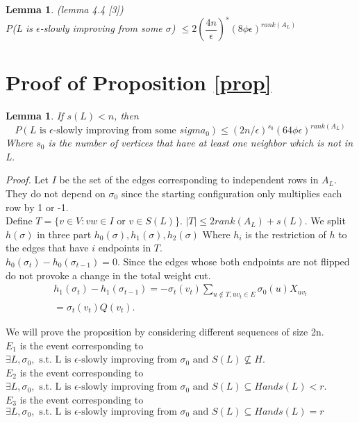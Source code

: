 \documentclass[12pt]{article}
\newtheorem{lemma}[theorem]{Lemma}
\begin{document}
\begin{lemma}(lemma 4.4 [3])\\
\label{bound}
P(L is $\epsilon$-slowly improving from some $\sigma$) $\leq 2 (\dfrac{4n}{\epsilon})^s (8\phi \epsilon)^{rank(A_L)}$

\end{lemma}


\section{Proof of Proposition \ref{prop}}

\begin{lemma}
If $s(L) < n$, then \\
\begin{equation*}
P(L \text{ is }\epsilon\text{-slowly improving from some }sigma_0)  \leq (2n/\epsilon)^{s_0}(64\phi\epsilon)^{rank(A_L)}
\end{equation*}
Where $s_0$ is the number of vertices that have at least one neighbor which is not in L. 
\end{lemma}

\textit{Proof.} Let $I$ be the set of the edges corresponding to independent rows in $A_L$. They do not depend on $\sigma_0$ since the starting configuration only multiplies each row by 1 or -1.\\
Define $T = \{v \in V: vw \in I \text{ or } v \in S(L)$\}. $|T| \leq 2 rank(A_L) + s(L)$. 
We split $h(\sigma)$ in three part $h_0(\sigma), h_1(\sigma), h_2(\sigma)$ Where $h_i$ is the restriction of $h$ to the edges that have $i$ endpoints in $T$. \\
$h_0(\sigma_t) - h_0(\sigma_{t -1}) = 0$. Since the edges whose both endpoints are not flipped do not provoke a change in the total weight cut. \\
\begin{equation*}
\begin{split}
h_1(\sigma_t) - h_1(\sigma_{t-1}) = -\sigma_t(v_t)\sum_{u \not\in T, uv_t \in E}\sigma_0(u)X_{uv_t} \\
= \sigma_t(v_t)Q(v_t).
\end{split}
\end{equation*}


We will prove the proposition by considering different sequences of size 2n.\\
$E_1$ is the event corresponding to $\exists L, \sigma_0, \text{ s.t. L is }\epsilon\text{-slowly improving from }\sigma_0 \text{ and }S(L) \not\subseteq H$.\\
$E_2$ is the event corresponding to $\exists L, \sigma_0,\text{ s.t. L is }\epsilon\text{-slowly improving from }\sigma_0\text{ and }S(L) \subseteq H and s(L) < r$. \\
$E_3$   is the event corresponding to $\exists L, \sigma_0,\text{ s.t. L is }\epsilon\text{-slowly improving from }\sigma_0\text{ and }S(L) \subseteq H and s(L) = r$ \\
\end{document}

